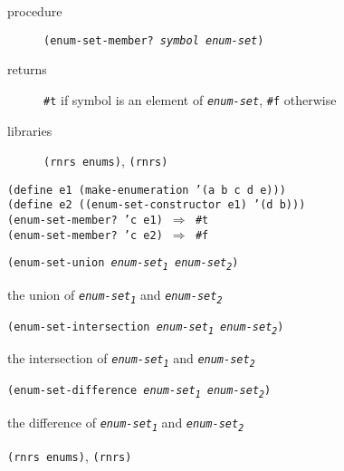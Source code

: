 \begin{description}

\label{objects_s297}\item[procedure] \texttt{(enum-set-member? \textit{symbol} \textit{enum-set})}



\item[returns] \texttt{\#{}t} if symbol is an element of \texttt{\textit{enum-set}}, \texttt{\#{}f} otherwise


\item[libraries] \texttt{(rnrs enums)}, \texttt{(rnrs)}
\end{description}


\begin{alltt}
(define e1 (make-enumeration '(a b c d e)))
(define e2 ((enum-set-constructor e1) '(d b)))
(enum-set-member? 'c e1) \(\Rightarrow\) \#{}t
(enum-set-member? 'c e2) \(\Rightarrow\) \#{}f
\end{alltt}

\begin{description}

\label{objects_s298}\item[procedure] \texttt{(enum-set-union \textit{enum-set\textsubscript{1}} \textit{enum-set\textsubscript{2}})}



\item[returns] the union of \texttt{\textit{enum-set\textsubscript{1}}} and \texttt{\textit{enum-set\textsubscript{2}}}


\item[procedure] \texttt{(enum-set-intersection \textit{enum-set\textsubscript{1}} \textit{enum-set\textsubscript{2}})}



\item[returns] the intersection of \texttt{\textit{enum-set\textsubscript{1}}} and \texttt{\textit{enum-set\textsubscript{2}}}


\item[procedure] \texttt{(enum-set-difference \textit{enum-set\textsubscript{1}} \textit{enum-set\textsubscript{2}})}



\item[returns] the difference of \texttt{\textit{enum-set\textsubscript{1}}} and \texttt{\textit{enum-set\textsubscript{2}}}


\item[libraries] \texttt{(rnrs enums)}, \texttt{(rnrs)}
\end{description}

